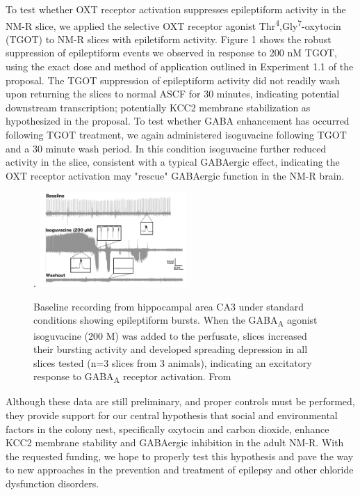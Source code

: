 \documentclass[11pt]{nih}
\begin{document}
\par To test whether OXT receptor activation suppresses epileptiform activity in the NM-R slice, we applied the selective OXT receptor agonist Thr\textsuperscript{4},Gly\textsuperscript{7}-oxytocin (TGOT) to NM-R slices with epiletiform activity.  Figure 1 shows the robust suppression of epileptiform events we observed in response to  200 nM TGOT, using the exact dose and method of application outlined in Experiment 1.1 of the proposal. The TGOT suppression of epileptiform activity did not readily wash upon returning the slices to normal ASCF for 30 minutes, indicating potential downstream transcription; potentially KCC2 membrane stabilization as hypothesized in the proposal. To test whether GABA enhancement has occurred following TGOT treatment, we again administered isoguvacine following TGOT and a 30 minute wash period.  In this condition isoguvacine further reduced activity in the slice, consistent with a typical GABAergic effect, indicating the OXT receptor activation may "rescue" GABAergic function in the NM-R brain. 
\begin{figure}.
 \centering
 \includegraphics[width=0.5\textwidth]{isoguvacine.png}
 \caption{Baseline recording from hippocampal area CA3 under standard conditions showing epileptiform bursts.  When the GABA\textsubscript {A} agonist isoguvacine (200 \textmu M) was added to the perfusate, slices  increased their bursting activity and developed spreading depression in all slices tested (n=3 slices from 3 animals), indicating an excitatory response to GABA\textsubscript {A} receptor activation.  From \cite{zions_2020_nest}}
\end{figure}
\par Although these data are still preliminary, and proper controls must be performed, they provide support for our central hypothesis that social and environmental factors in the colony nest, specifically oxytocin and carbon dioxide, enhance KCC2 membrane stability and GABAergic inhibition in the adult NM-R.  With the requested funding, we hope to properly test this hypothesis and pave the way to new approaches in the prevention and treatment of epilepsy and other chloride dysfunction disorders.


\newpage

\end{document}

